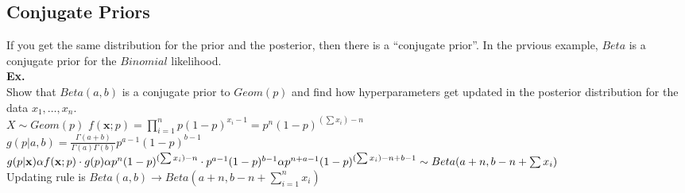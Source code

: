 \documentclass{article}
\begin{document}
\subsection{Conjugate Priors}
If you get the same distribution for the prior and the posterior, then there is a ``conjugate prior''. In the prvious example, $Beta$ is a conjugate prior for the $Binomial$ likelihood.\\
\textbf{Ex.}\\
Show that $Beta(a,b)$ is a conjugate prior to $Geom(p)$ and find how hyperparameters get updated in the posterior distribution for the data $x_1,\dots,x_n$.\\
$X\sim Geom(p)$\hspace*{0.5in} $f(\mathbf{x};p)=\prod_{i=1}^np(1-p)^{x_i-1}=p^n(1-p)^{(\sum x_i) - n}$\\
$g(p\vert a,b)=\frac{\Gamma(a+b)}{\Gamma(a)\Gamma(b)} p^{a-1}(1-p)^{b-1}$\\
$g(p\vert\mathbf{x})\alpha f(\mathbf{x};p)\cdot g(p)\alpha p^n(1-p)^{(\sum x_i) - n}\cdot p^{a-1}(1-p)^{b-1}\\\alpha p^{n+a-1}(1-p)^{(\sum x_i)-n+b-1}\sim Beta(a+n,b-n+\sum x_i)$\\
Updating rule is $Beta(a,b)\rightarrow Beta(a+n,b-n+\sum_{i=1}^n x_i)$
\end{document}
